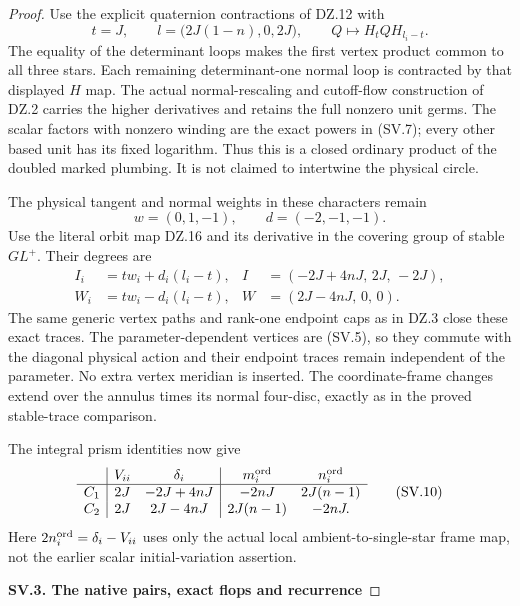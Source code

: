 \begin{proof}
Use the explicit quaternion contractions of DZ.12
with
\[
 t=J,\qquad
 l=\bigl(2J(1-n),0,2J\bigr),\qquad
                 Q\mapsto H_t QH_{l_i-t}.            \tag{SV.8}
\]
The equality of the determinant loops makes the
first vertex product common to all three stars.
Each remaining determinant-one normal loop is
contracted by that displayed \(H\) map. The actual
normal-rescaling and cutoff-flow construction of
DZ.2 carries the higher derivatives and retains
the full nonzero unit germs. The scalar factors
with nonzero winding are the exact powers in
(SV.7); every other based unit has its fixed
logarithm. Thus this is a closed ordinary product
of the doubled marked plumbing. It is not claimed
to intertwine the physical circle.

The physical tangent and normal weights in these
characters remain
\[
                  w=(0,1,-1),\qquad d=(-2,-1,-1).
\]
Use the literal orbit map DZ.16 and its derivative
in the covering group of stable \(GL^+\). Their
degrees are
\[
 \begin{split}
 I_i&=t w_i+d_i(l_i-t),&
 I&=(-2J+4nJ,\,2J,\,-2J),\\
 W_i&=t w_i-d_i(l_i-t),&
 W&=(2J-4nJ,\,0,\,0).
 \end{split}                                          \tag{SV.9}
\]
The same generic vertex paths and rank-one endpoint
caps as in DZ.3 close these exact traces. The
parameter-dependent vertices are (SV.5), so they
commute with the diagonal physical action and
their endpoint traces remain independent of the
parameter. No extra vertex meridian is inserted.
The coordinate-frame changes extend over the
annulus times its normal four-disc, exactly as
in the proved stable-trace comparison.

The integral prism identities now give
\[
 \begin{array}{c|cc|cc}
 &V_{ii}&\delta_i&m_i^{\rm ord}&n_i^{\rm ord}\\ \hline
 C_1&2J&-2J+4nJ&-2nJ&2J(n-1)\\
 C_2&2J& 2J-4nJ&2J(n-1)&-2nJ .
 \end{array}                                          \tag{SV.10}
\]
Here \(2n_i^{\rm ord}=\delta_i-V_{ii}\) uses only
the actual local ambient-to-single-star frame map,
not the earlier scalar initial-variation assertion.

\par

\medskip\noindent\textbf{SV.3. The native pairs, exact flops and recurrence}

\par\nobreak


\end{proof}
